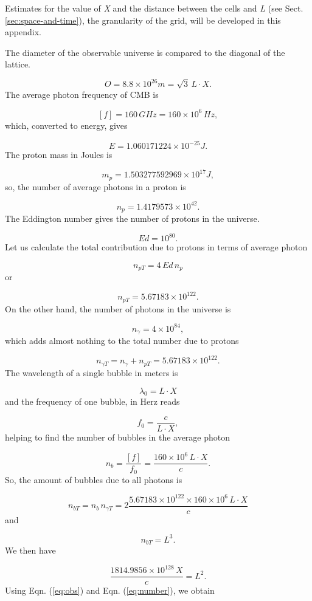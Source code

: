 \documentclass[12pt]{article}
\begin{document}
Estimates for the value of \emph{X} and the distance between the cells
and \emph{L} (see Sect. \ref{sec:space-and-time}), the granularity
of the grid, will be developed in this appendix.

The diameter of the observable universe \cite{halpbern} is compared
to the diagonal of the lattice.

\begin{equation}
O=8.8\times10^{26}m=\sqrt{3}\,L\cdot X.\label{eq:obs}
\end{equation}
The average photon frequency of CMB \cite{archeops} is

\[
[f]=160\,GHz=160\times10^{6}\,Hz,
\]
which, converted to energy, gives

\[
E=1.060171224\times10^{-25}J.
\]
The proton mass in Joules is

\[
m_{p}=1.503277592969\times10^{17}J,
\]
so, the number of average photons in a proton is

\[
n_{p}=1.4179573\times10^{42}.
\]
The Eddington number gives the number of protons in the universe.

\[
Ed=10^{80}.
\]
Let us calculate the total contribution due to protons in terms of
average photon

\[
n_{pT}=4\,Ed\,n_{p}
\]
or

\[
n_{pT}=5.67183\times10^{122}.
\]
On the other hand, the number of photons in the universe is

\[
n_{\gamma}=4\times10^{84},
\]
which adds almost nothing to the total number due to protons

\[
n_{\gamma T}=n_{\gamma}+n_{pT}=5.67183\times10^{122}.
\]
The wavelength of a single bubble in meters is

\[
\lambda_{0}=L\cdot X
\]
and the frequency of one bubble, in Herz reads

\[
f_{0}=\frac{c}{L\cdot X},
\]
helping to find the number of bubbles in the average photon

\[
n_{b}=\frac{[f]}{f_{0}}=\frac{160\times10^{6}\,L\cdot X}{c}.
\]
So, the amount of bubbles due to all photons is

\[
n_{bT}=n_{b}\,n_{\gamma T}=2\frac{5.67183\times10^{122}\times160\times10^{6}\,L\cdot X}{c}
\]
and

\[
n_{bT}=L^{3}.
\]
We then have

\begin{equation}
\frac{1814.9856\times10^{128}\,X}{c}=L^{2}.\label{eq:number}
\end{equation}
Using Eqn. (\ref{eq:obs}) and Eqn. (\ref{eq:number}), we obtain 
\end{document}
